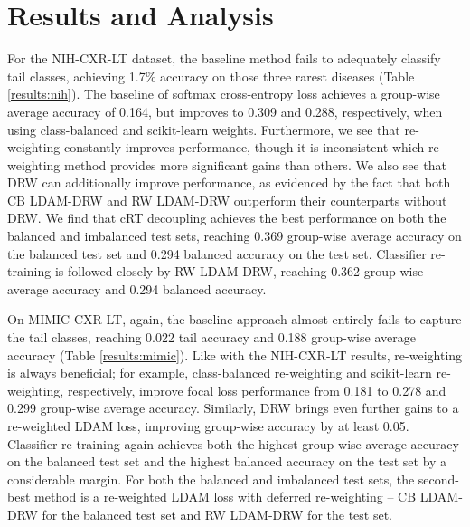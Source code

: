 \documentclass[runningheads]{llncs}
\begin{document}
\section{Results and Analysis}
For the NIH-CXR-LT dataset, the baseline method fails to adequately classify tail classes, achieving 1.7\% accuracy on those three rarest diseases (Table \ref{results:nih}). The baseline of softmax cross-entropy loss achieves a group-wise average accuracy of 0.164, but improves to 0.309 and 0.288, respectively, when using class-balanced and scikit-learn weights. Furthermore, we see that re-weighting constantly improves performance, though it is inconsistent which re-weighting method provides more significant gains than others. We also see that DRW can additionally improve performance, as evidenced by the fact that both CB LDAM-DRW and RW LDAM-DRW outperform their counterparts without DRW. We find that cRT decoupling achieves the best performance on both the balanced and imbalanced test sets, reaching 0.369 group-wise average accuracy on the balanced test set and 0.294 balanced accuracy on the test set. Classifier re-training is followed closely by RW LDAM-DRW, reaching 0.362 group-wise average accuracy and 0.294 balanced accuracy.

On MIMIC-CXR-LT, again, the baseline approach almost entirely fails to capture the tail classes, reaching 0.022 tail accuracy and 0.188 group-wise average accuracy (Table \ref{results:mimic}). Like with the NIH-CXR-LT results, re-weighting is always beneficial; for example, class-balanced re-weighting and scikit-learn re-weighting, respectively, improve focal loss performance from 0.181 to 0.278 and 0.299 group-wise average accuracy. Similarly, DRW brings even further gains to a re-weighted LDAM loss, improving group-wise accuracy by at least 0.05. Classifier re-training again achieves both the highest group-wise average accuracy on the balanced test set and the highest balanced accuracy on the test set by a considerable margin. For both the balanced and imbalanced test sets, the second-best method is a re-weighted LDAM loss with deferred re-weighting -- CB LDAM-DRW for the balanced test set and RW LDAM-DRW for the test set. 
\end{document}
